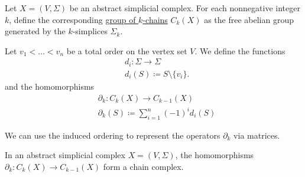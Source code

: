 \begin{definition}\label{def:group_of_chains}\cite[262]{Carlsson2009}
  Let $X = (V, \Sigma)$ be an abstract simplicial complex. For each nonnegative integer $k$, define the corresponding \uline{group of $k$-chains} $C_k(X)$ as the free abelian group generated by the $k$-simplices $\Sigma_k$.

  Let $v_1 < \ldots < v_n$ be a total order on the vertex set $V$. We define the functions
  \begin{align*}
    &d_i: \Sigma \to \Sigma \\
    &d_i(S) \coloneqq S \setminus \{ v_i \}.
  \end{align*}
  and the homomorphisms
  \begin{align*}
    &\partial_k: C_k(X) \to C_{k-1}(X) \\
    &\partial_k(S) \coloneqq \sum_{i=1}^n (-1)^i d_i(S)
  \end{align*}

  We can use the induced ordering to represent the operators $\partial_k$ via matrices.
\end{definition}

\begin{proposition}\label{def:abstract_simplicial_chain_complex}
  In an abstract simplicial complex $X = (V, \Sigma)$, the homomorphisms $\partial_k: C_k(X) \to C_{k-1}(X)$ form a chain complex.
\end{proposition}
